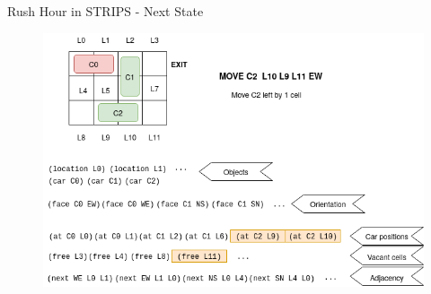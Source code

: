\begin{frame}{Rush Hour in STRIPS - Next State}
\begin{figure}[!htb]
  \centering
  \includegraphics[width=\columnwidth, keepaspectratio=true]{img/s2.png}
\end{figure}
\end{frame}